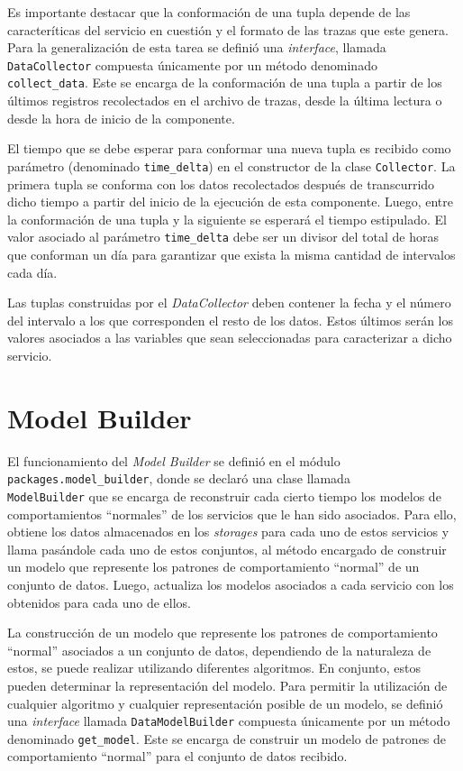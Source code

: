 Es importante destacar que la conformación de una tupla depende de las
caracteríticas del servicio en cuestión y el formato de las trazas que este
genera. Para la generalización de esta tarea se definió una \textit{interface}, 
llamada \texttt{DataCollector} compuesta únicamente por un método denominado
\texttt{collect\_data}. Este se encarga de la conformación de una tupla a partir
de los últimos registros recolectados en el archivo de trazas, desde la última
lectura o desde la hora de inicio de la componente. 

El tiempo que se debe esperar para conformar una nueva tupla es recibido como
parámetro (denominado \texttt{time\_delta}) en el constructor de la clase
\texttt{Collector}. La primera tupla se conforma con los datos recolectados
después de transcurrido dicho tiempo a partir del inicio de la ejecución de esta
componente. Luego, entre la conformación de una tupla y la siguiente se esperará
el tiempo estipulado. El valor asociado al parámetro \texttt{time\_delta} debe
ser un divisor del total de horas que conforman un día para garantizar que
exista la misma cantidad de intervalos cada día.

Las tuplas construidas por el \emph{DataCollector} deben contener la fecha y el
número del intervalo a los que corresponden el resto de los datos. Estos últimos
serán los valores asociados a las variables que sean seleccionadas para
caracterizar a dicho servicio. 

\section{Model Builder}
El funcionamiento del \textit{Model Builder} se definió en el módulo \\
\texttt{packages.model\_builder}, donde se declaró una clase llamada \\
\texttt{ModelBuilder} que se encarga de reconstruir cada cierto tiempo los
modelos de comportamientos ``normales'' de los servicios que le han sido
asociados. Para ello, obtiene los datos almacenados en los \textit{storages}
para cada uno de estos servicios y llama pasándole cada uno de estos conjuntos,
al método encargado de construir un modelo que represente los patrones de
comportamiento ``normal'' de un conjunto de datos. Luego, actualiza los modelos
asociados a cada servicio con los obtenidos para cada uno de ellos.

La construcción de un modelo que represente los patrones de comportamiento
``normal'' asociados a un conjunto de datos, dependiendo de la naturaleza de
estos, se puede realizar utilizando diferentes algoritmos. En conjunto, estos
pueden determinar la representación del modelo. Para permitir la utilización de
cualquier algoritmo y cualquier representación posible de un modelo, se definió
una \textit{interface} llamada \texttt{DataModelBuilder} compuesta únicamente
por un método denominado \texttt{get\_model}. Este se encarga de construir un
modelo de patrones de comportamiento ``normal'' para el conjunto de datos
recibido. 

